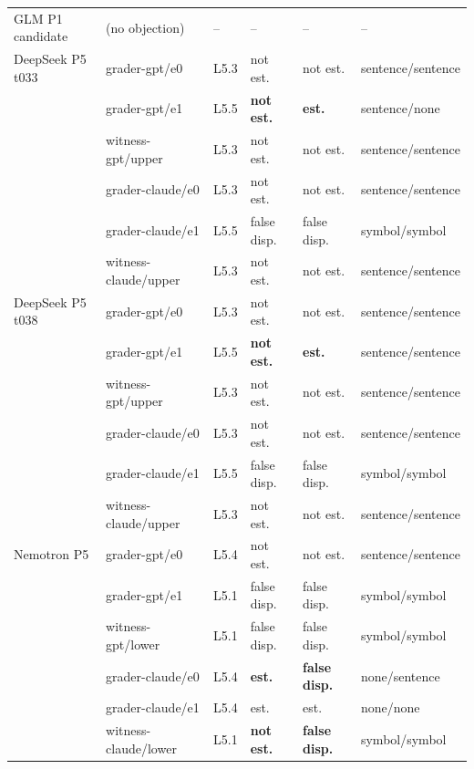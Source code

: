 \begin{tabular}{@{}llllll@{}}
GLM P1 candidate & (no objection) & -- & -- & -- & -- \\
\addlinespace[2pt]
DeepSeek P5 t033 & grader-gpt/e0 & L5.3 & not est. & not est. & sentence/sentence \\
 & grader-gpt/e1 & L5.5 & \textbf{not est.} & \textbf{est.} & sentence/none \\
 & witness-gpt/upper & L5.3 & not est. & not est. & sentence/sentence \\
 & grader-claude/e0 & L5.3 & not est. & not est. & sentence/sentence \\
 & grader-claude/e1 & L5.5 & false disp. & false disp. & symbol/symbol \\
 & witness-claude/upper & L5.3 & not est. & not est. & sentence/sentence \\
\addlinespace[2pt]
DeepSeek P5 t038 & grader-gpt/e0 & L5.3 & not est. & not est. & sentence/sentence \\
 & grader-gpt/e1 & L5.5 & \textbf{not est.} & \textbf{est.} & sentence/sentence \\
 & witness-gpt/upper & L5.3 & not est. & not est. & sentence/sentence \\
 & grader-claude/e0 & L5.3 & not est. & not est. & sentence/sentence \\
 & grader-claude/e1 & L5.5 & false disp. & false disp. & symbol/symbol \\
 & witness-claude/upper & L5.3 & not est. & not est. & sentence/sentence \\
\addlinespace[2pt]
Nemotron P5 & grader-gpt/e0 & L5.4 & not est. & not est. & sentence/sentence \\
 & grader-gpt/e1 & L5.1 & false disp. & false disp. & symbol/symbol \\
 & witness-gpt/lower & L5.1 & false disp. & false disp. & symbol/symbol \\
 & grader-claude/e0 & L5.4 & \textbf{est.} & \textbf{false disp.} & none/sentence \\
 & grader-claude/e1 & L5.4 & est. & est. & none/none \\
 & witness-claude/lower & L5.1 & \textbf{not est.} & \textbf{false disp.} & symbol/symbol \\
\bottomrule
\end{tabular}
